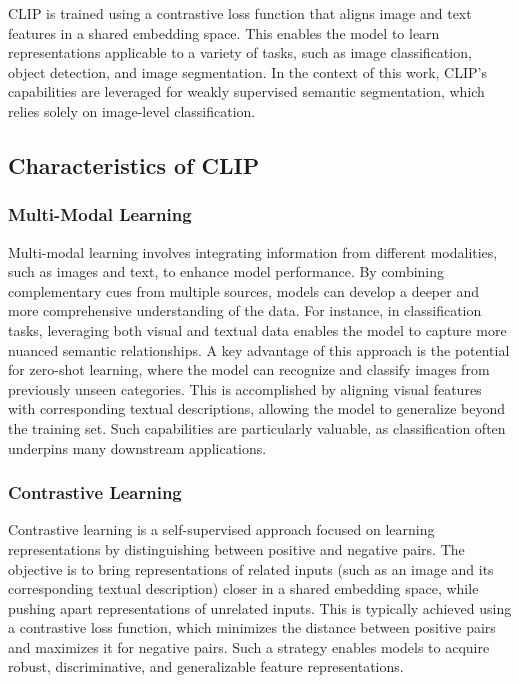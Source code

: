 CLIP is trained using a contrastive loss function that aligns image and text features in a shared embedding space. This enables the model to learn representations applicable to a variety of tasks, such as image classification, object detection, and image segmentation. In the context of this work, CLIP's capabilities are leveraged for weakly supervised semantic segmentation, which relies solely on image-level classification.

\subsection{Characteristics of CLIP}
\subsubsection{Multi-Modal Learning}
\label{subsec:multi_modal_learning}
Multi-modal learning involves integrating information from different modalities, such as images and text, to enhance model performance. By combining complementary cues from multiple sources, models can develop a deeper and more comprehensive understanding of the data. For instance, in classification tasks, leveraging both visual and textual data enables the model to capture more nuanced semantic relationships. A key advantage of this approach is the potential for zero-shot learning, where the model can recognize and classify images from previously unseen categories. This is accomplished by aligning visual features with corresponding textual descriptions, allowing the model to generalize beyond the training set. Such capabilities are particularly valuable, as classification often underpins many downstream applications.

\subsubsection{Contrastive Learning}
\label{subsec:contrastive_learning}
Contrastive learning is a self-supervised approach focused on learning representations by distinguishing between positive and negative pairs. The objective is to bring representations of related inputs (such as an image and its corresponding textual description) closer in a shared embedding space, while pushing apart representations of unrelated inputs. This is typically achieved using a contrastive loss function, which minimizes the distance between positive pairs and maximizes it for negative pairs. Such a strategy enables models to acquire robust, discriminative, and generalizable feature representations.

